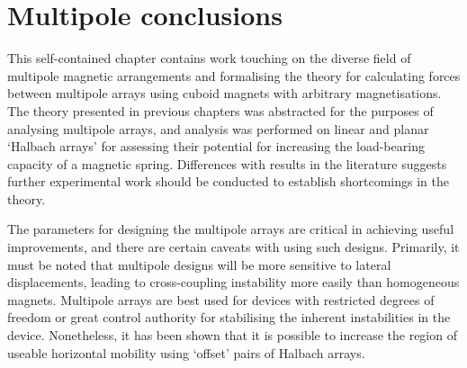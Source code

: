 \documentclass[11pt,a4paper]{memoir}
\begin{document}
\section{Multipole conclusions}

This self-contained chapter contains work touching on the diverse field of multipole magnetic arrangements and formalising the theory for calculating forces between multipole arrays using cuboid magnets with arbitrary magnetisations.
The theory presented in previous chapters was abstracted for the purposes of analysing multipole arrays, and analysis was performed on linear and planar `Halbach arrays' for assessing their potential for increasing the load-bearing capacity of a magnetic spring.
Differences with results in the literature suggests further experimental work should be conducted to establish shortcomings in the theory.

The parameters for designing the multipole arrays are critical in achieving useful improvements, and there are certain caveats with using such designs.
Primarily, it must be noted that multipole designs will be more sensitive to lateral displacements, leading to cross-coupling instability more easily than homogeneous magnets.
Multipole arrays are best used for devices with restricted degrees of freedom or great control authority for stabilising the inherent instabilities in the device.
Nonetheless, it has been shown that it is possible to increase the region of useable horizontal mobility using `offset' pairs of Halbach arrays.
\end{document}
